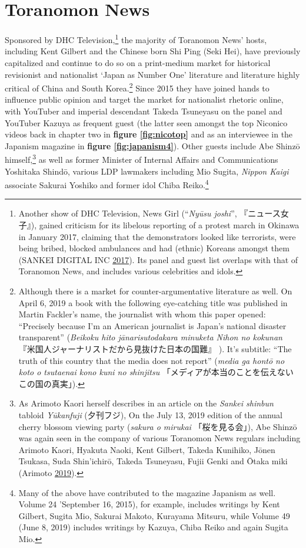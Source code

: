 \documentclass[10pt,british,A4paper,twoside]{memoir}
\begin{document}
\section{Toranomon News}\label{toranomon-news}

Sponsored by DHC Television,\footnote{Another show of DHC Television,
  News Girl (``\emph{Nyūsu joshi}'', 『ニュース女子』), gained criticism
  for its libelous reporting of a protest march in Okinawa in January
  2017, claiming that the demonstrators looked like terrorists, were
  being bribed, blocked ambulances and had (ethnic) Koreans amongst them
  (SANKEI DIGITAL INC
  \protect\hyperlink{ref-sankei_digital_inc_eng._2017}{2017}). Its panel
  and guest list overlaps with that of Toranomon News, and includes
  various celebrities and idols.} the majority of Toranomon News' hosts,
including Kent Gilbert and the Chinese born Shi Ping (Seki Hei), have
previously capitalized and continue to do so on a print-medium market
for historical revisionist and nationalist `Japan as Number One'
literature and literature highly critical of China and South
Korea.\footnote{Although there is a market for counter-argumentative
  literature as well. On April 6, 2019 a book with the following eye-catching
  title was published in Martin Fackler's name, the journalist with whom
  this paper opened: ``Precisely because I'm an American journalist is
  Japan's national disaster transparent'' (\emph{Beikoku hito
  jānarisutodakara minuketa Nihon no kokunan}
  『米国人ジャーナリストだから見抜けた日本の国難』 ). It's subtitle:
  ``The truth of this country that the media does not report''
  (\emph{media ga hontō no koto o tsutaenai kono kuni no shinjitsu}
  「メディアが本当のことを伝えないこの国の真実」).} Since 2015 they have
joined hands to influence public opinion and target the market for
nationalist rhetoric online, with YouTuber and imperial descendant
Takeda Tsuneyasu on the panel and YouTuber Kazuya as frequent guest (the
latter seen amongst the top Niconico videos back in chapter two in
\textbf{figure \ref{fig:nicotop}} and as an interviewee in the
Japanism magazine in \textbf{figure \ref{fig:japanism4}}). Other guests
include Abe Shinzō himself,\footnote{As Arimoto Kaori herself describes
  in an article on the \emph{Sankei shinbun} tabloid \emph{Yūkanfuji}
  (夕刊フジ), On the July 13, 2019 edition of the annual cherry blossom
  viewing party (\emph{sakura o mirukai} 「桜を見る会」), Abe Shinzō was
  again seen in the company of various Toranomon News regulars including
  Arimoto Kaori, Hyakuta Naoki, Kent Gilbert, Takeda Kunihiko, Jōnen
  Tsukasa, Suda Shin'ichirō, Takeda Tsuneyasu, Fujii Genki and Ōtaka
  miki (Arimoto \protect\hyperlink{ref-arimoto_eng._2019}{2019}).} as
well as former Minister of Internal Affairs and Communications Yoshitaka
Shindō, various LDP lawmakers including Mio Sugita, \emph{Nippon Kaigi}
associate Sakurai Yoshiko and former idol Chiba Reiko.\footnote{Many of
  the above have contributed to the magazine Japanism as well. Volume 24
  'September 16, 2015), for example, includes writings by Kent Gilbert,
  Sugita Mio, Sakurai Makoto, Kurayama Mitsuru, while Volume 49 (June 8,
  2019) includes writings by Kazuya, Chiba Reiko and again Sugita Mio.}
\end{document}
